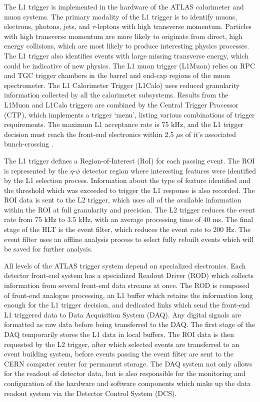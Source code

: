 	The L1 trigger is implemented in the hardware of the ATLAS calorimeter and muon systems. The primary modality of the L1 trigger is to identify muons, electrons, photons, jets, and $\tau$-leptons with high transverse momentum. Particles with high transverse momentum are more likely to originate from direct, high energy collisions, which are most likely to produce interesting physics processes. The L1 trigger also identifies events with large missing transverse energy, which could be indicative of new physics. The L1 muon trigger (L1Muon) relies on RPC and TGC trigger chambers in the barrel and end-cap regions of the muon spectrometer. The L1 Calorimeter Trigger (L1Calo) uses reduced granularity information collected by all the calorimeter subsystems. Results from the L1Muon and L1Calo triggers are combined by the Central Trigger Processor (CTP), which implements a trigger `menu', listing various combinations of trigger requirements. The maximum L1 acceptance rate is 75 kHz, and the L1 trigger decision must reach the front-end electronics within 2.5 $\mu$s of it's associated bunch-crossing \cite{atlas_overview}.\par
	
	The L1 trigger defines a Region-of-Interest (RoI) for each passing event. The ROI is represented by the $\eta$-$\phi$ detector region where interesting features were identified by the L1 selection process. Information about the type of feature identified and the threshold which was exceeded to trigger the L1 response is also recorded. The ROI data is sent to the L2 trigger, which uses all of the available information within the ROI at full granularity and precision. The L2 trigger reduces the event rate from 75 kHz to 3.5 kHz, with an average processing time of 40 ms. The final stage of the HLT is the event filter, which reduces the event rate to 200 Hz. The event filter uses an offline analysis process to select fully rebuilt events which will be saved for further analysis. \par
	
	All levels of the ATLAS trigger system depend on specialized electronics. Each detector front-end system has a specialized Readout Driver (ROD) which collects information from several front-end data streams at once. The ROD is composed of front-end analogue processing, an L1 buffer which retains the information long enough for the L1 trigger decision, and dedicated links which send the front-end L1 triggered data to Data Acquisition System (DAQ). Any digital signals are formatted as raw data before being transferred to the DAQ.  The first stage of the DAQ temporarily stores the L1 data in local buffers. The ROI data is then requested by the L2 trigger, after which selected events are transferred to an event building system, before events passing the event filter are sent to the CERN computer center for permanent storage. The DAQ system not only allows for the readout of detector data, but is also responsible for the monitoring and configuration of the hardware and software components which make up the data readout system via the Detector Control System (DCS). \par
	
